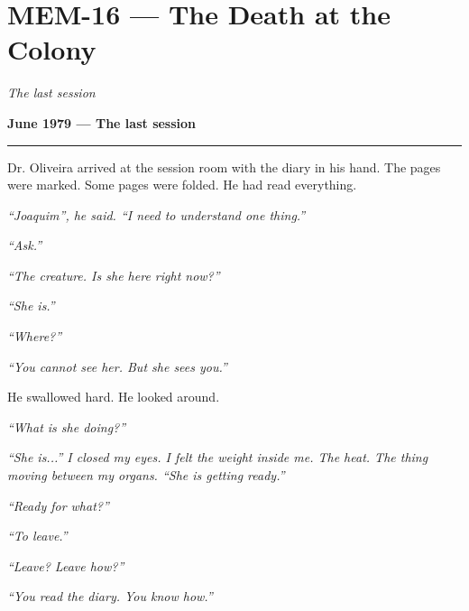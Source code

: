 \section*{\textbf{MEM-16} --- The Death at the Colony}

\noindent \textit{The last session}

\noindent \textbf{June 1979 --- The last session}

\vspace{0.5em}\noindent\rule{\textwidth}{0.5pt}\vspace{0.5em}

\noindent Dr. Oliveira arrived at the session room with the diary in his hand. The pages were marked. Some pages were folded. He had read everything.

\noindent \textit{\textquotedblleft{}Joaquim\textquotedblright{}\textit{, he said. }\textquotedblleft{}I need to understand one thing.\textquotedblright{}}

\noindent \textit{\textquotedblleft{}Ask.\textquotedblright{}}

\noindent \textit{\textquotedblleft{}The creature. Is she here right now?\textquotedblright{}}

\noindent \textit{\textquotedblleft{}She is.\textquotedblright{}}

\noindent \textit{\textquotedblleft{}Where?\textquotedblright{}}

\noindent \textit{\textquotedblleft{}You cannot see her. But she sees you.\textquotedblright{}}

\noindent He swallowed hard. He looked around.

\noindent \textit{\textquotedblleft{}What is she doing?\textquotedblright{}}

\noindent \textit{\textquotedblleft{}She is...\textquotedblright{}\textit{ I closed my eyes. I felt the weight inside me. The heat. The thing moving between my organs. }\textquotedblleft{}She is getting ready.\textquotedblright{}}

\noindent \textit{\textquotedblleft{}Ready for what?\textquotedblright{}}

\noindent \textit{\textquotedblleft{}To leave.\textquotedblright{}}

\noindent \textit{\textquotedblleft{}Leave? Leave how?\textquotedblright{}}

\noindent \textit{\textquotedblleft{}You read the diary. You know how.\textquotedblright{}}

